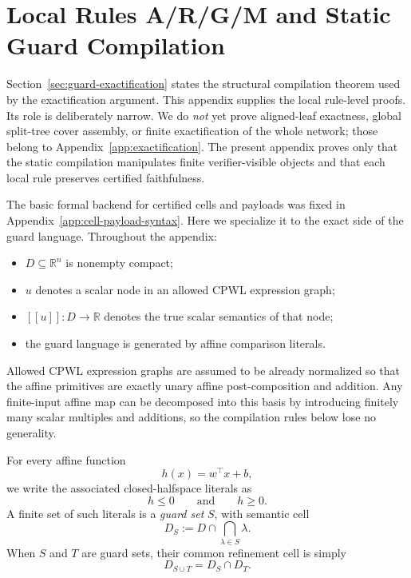 \section{Local Rules A/R/G/M and Static Guard Compilation}
\label{app:guard-rules}

Section~\ref{sec:guard-exactification} states the structural compilation theorem used by the exactification argument. This appendix supplies the local rule-level proofs. Its role is deliberately narrow. We do \emph{not} yet prove aligned-leaf exactness, global split-tree cover assembly, or finite exactification of the whole network; those belong to Appendix~\ref{app:exactification}. The present appendix proves only that the static compilation manipulates finite verifier-visible objects and that each local rule preserves certified faithfulness.

The basic formal backend for certified cells and payloads was fixed in Appendix~\ref{app:cell-payload-syntax}. Here we specialize it to the exact side of the guard language. Throughout the appendix:
\begin{itemize}
    \item $D\subseteq \mathbb R^n$ is nonempty compact;
    \item $u$ denotes a scalar node in an allowed CPWL expression graph;
    \item $[[u]]:D\to\mathbb R$ denotes the true scalar semantics of that node;
    \item the guard language is generated by affine comparison literals.
\end{itemize}

Allowed CPWL expression graphs are assumed to be already normalized so that the affine primitives are exactly unary affine post-composition and addition. Any finite-input affine map can be decomposed into this basis by introducing finitely many scalar multiples and additions, so the compilation rules below lose no generality.

For every affine function
\[
 h(x)=w^\top x+b,
\]
we write the associated closed-halfspace literals as
\[
 h\le 0
 \qquad\text{and}\qquad
 h\ge 0.
\]
A finite set of such literals is a \emph{guard set} $S$, with semantic cell
\[
 D_S:=D\cap \bigcap_{\lambda\in S}\lambda.
\]
When $S$ and $T$ are guard sets, their common refinement cell is simply
\[
 D_{S\cup T}=D_S\cap D_T.
\]

